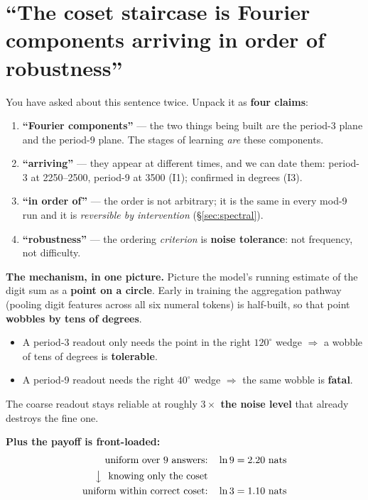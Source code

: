 \documentclass[11pt]{article}
\begin{document}
\section{``The coset staircase is Fourier components arriving in order of robustness''}

You have asked about this sentence twice. Unpack it as \textbf{four claims}:

\begin{enumerate}[leftmargin=*,itemsep=2pt]
\item \textbf{``Fourier components''} --- the two things being built are the
period-3 plane and the period-9 plane. The stages of learning \emph{are} these
components.
\item \textbf{``arriving''} --- they appear at different times, and we can date
them: period-3 at 2250--2500, period-9 at 3500 (I1); confirmed in degrees (I3).
\item \textbf{``in order of''} --- the order is not arbitrary; it is the same in
every mod-9 run and it is \emph{reversible by intervention} (\S\ref{sec:spectral}).
\item \textbf{``robustness''} --- the ordering \emph{criterion} is \textbf{noise
tolerance}: not frequency, not difficulty.
\end{enumerate}

\textbf{The mechanism, in one picture.} Picture the model's running estimate of the
digit sum as a \textbf{point on a circle}. Early in training the aggregation
pathway (pooling digit features across all six numeral tokens) is half-built, so
that point \textbf{wobbles by tens of degrees}.

\begin{itemize}[leftmargin=*,itemsep=1pt]
\item A period-3 readout only needs the point in the right $120^\circ$ wedge
$\Rightarrow$ a wobble of tens of degrees is \textbf{tolerable}.
\item A period-9 readout needs the right $40^\circ$ wedge $\Rightarrow$ the same
wobble is \textbf{fatal}.
\end{itemize}

The coarse readout stays reliable at roughly \textbf{$3\times$ the noise level}
that already destroys the fine one.

\textbf{Plus the payoff is front-loaded:}
\begin{align*}
\text{uniform over 9 answers:} &\quad \ln 9 = 2.20 \text{ nats} \\
\big\downarrow\ \ \text{knowing only the coset} & \\
\text{uniform within correct coset:} &\quad \ln 3 = 1.10 \text{ nats}
\end{align*}
\end{document}
